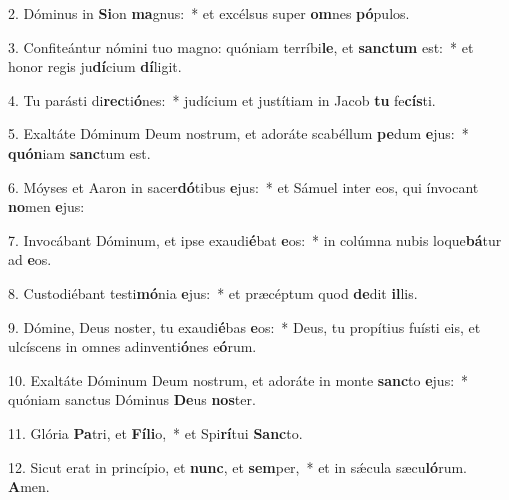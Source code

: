 2. Dóminus in \textbf{Si}on \textbf{ma}gnus:~*  et excélsus super \textbf{om}nes \textbf{pó}pulos.\

3. Confiteántur nómini tuo magno: quóniam terríbi\textbf{le}, et \textbf{sanc}\textbf{tum} est:~*  et honor regis ju\textbf{dí}cium \textbf{dí}ligit.\

4. Tu parásti di\textbf{rec}ti\textbf{ó}nes:~*  judícium et justítiam in Jacob \textbf{tu} fe\textbf{cís}ti.\

5. Exaltáte Dóminum Deum nostrum, et adoráte scabéllum \textbf{pe}dum \textbf{e}jus:~*  \textbf{quón}iam \textbf{sanc}tum est.\

6. Móyses et Aaron in sacer\textbf{dó}tibus \textbf{e}jus:~*  et Sámuel inter eos, qui ínvocant \textbf{no}men \textbf{e}jus:\

7. Invocábant Dóminum, et ipse exaudi\textbf{é}bat \textbf{e}os:~*  in colúmna nubis loque\textbf{bá}tur ad \textbf{e}os.\

8. Custodiébant testi\textbf{mó}nia \textbf{e}jus:~*  et præcéptum quod \textbf{de}dit \textbf{il}lis.\

9. Dómine, Deus noster, tu exaudi\textbf{é}bas \textbf{e}os:~*  Deus, tu propítius fuísti eis, et ulcíscens in omnes adinventi\textbf{ó}nes e\textbf{ó}rum.\

10. Exaltáte Dóminum Deum nostrum, et adoráte in monte \textbf{sanc}to \textbf{e}jus:~*  quóniam sanctus Dóminus \textbf{De}us \textbf{nos}ter.\

11. Glória \textbf{Pa}tri, et \textbf{Fí}\textbf{li}o,~*  et Spi\textbf{rí}tui \textbf{Sanc}to.\

12. Sicut erat in princípio, et \textbf{nunc}, et \textbf{sem}per,~*  et in sǽcula sæcu\textbf{ló}rum. \textbf{A}men.\

